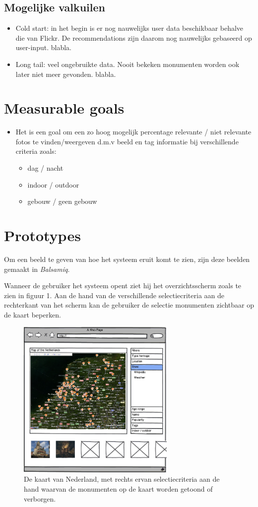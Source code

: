 \documentclass{article}
\begin{document}
\subsection{Mogelijke valkuilen}
\begin{itemize}
\item Cold start: in het begin is er nog nauwelijks user data beschikbaar behalve die van Flickr. De recommendations zijn daarom nog nauwelijks gebaseerd op user-input. blabla.
\item Long tail: veel ongebruikte data. Nooit bekeken monumenten worden ook later niet meer gevonden. blabla.
\end{itemize}
\section{Measurable goals}
\begin{itemize}
\item Het is een goal om een zo hoog mogelijk percentage relevante / niet relevante fotos te vinden/weergeven d.m.v beeld en tag informatie bij verschillende criteria zoals:
\begin{itemize}
\item dag / nacht
\item indoor / outdoor
\item gebouw / geen gebouw
\end{itemize}

\end{itemize}
\section{Prototypes}
Om een beeld te geven van hoe het systeem eruit komt te zien, zijn deze beelden gemaakt in \emph{Balsamiq}. 

Wanneer de gebruiker het systeem opent ziet hij het overzichtsscherm zoals te zien in figuur 1. Aan de hand van de verschillende selectiecriteria aan de rechterkant van het scherm kan de gebruiker de selectie monumenten zichtbaar op de kaart beperken.
\begin{figure}[htp]
  \centering
  \includegraphics[width=3in]{user-story-overview.png}
  \caption[Het overzichtsscherm]%
  {De kaart van Nederland, met rechts ervan selectiecriteria aan de hand waarvan de monumenten op de kaart worden getoond of verborgen.}
\end{figure}
\end{document}
